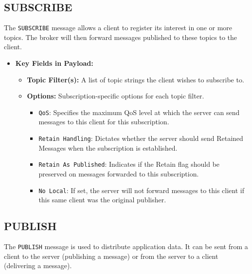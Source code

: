 \documentclass[a4paper, 12pt]{book} %
\begin{document}
\subsection{SUBSCRIBE}\label{subscribe}

The \texttt{SUBSCRIBE} message allows a client to register its interest
in one or more topics. The broker will then forward messages published
to these topics to the client.

\begin{itemize}
\tightlist
\item
  \textbf{Key Fields in Payload:}

  \begin{itemize}
  \tightlist
  \item
    \textbf{Topic Filter(s):} A list of topic strings the client wishes
    to subscribe to.
  \item
    \textbf{Options:} Subscription-specific options for each topic
    filter.

    \begin{itemize}
    \tightlist
    \item
      \texttt{QoS}: Specifies the maximum QoS level at which the server
      can send messages to this client for this subscription.
    \item
      \texttt{Retain\ Handling}: Dictates whether the server should send
      Retained Messages when the subscription is established.
    \item
      \texttt{Retain\ As\ Published}: Indicates if the Retain flag
      should be preserved on messages forwarded to this subscription.
    \item
      \texttt{No\ Local}: If set, the server will not forward messages
      to this client if this same client was the original publisher.
    \end{itemize}
  \end{itemize}
\end{itemize}

\subsection{PUBLISH}\label{publish}

The \texttt{PUBLISH} message is used to distribute application data. It
can be sent from a client to the server (publishing a message) or from
the server to a client (delivering a message).
\end{document}
